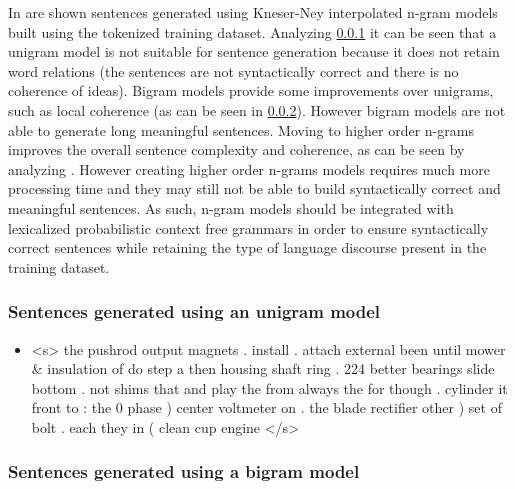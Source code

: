 In  are shown sentences generated using Kneser-Ney interpolated n-gram models built using the tokenized training dataset.
Analyzing \cref{subsec:unigram-sentences} it can be seen that a unigram model is not suitable for sentence generation because it does not retain word relations (the sentences are not syntactically correct and there is no coherence of ideas). Bigram models provide some improvements over unigrams, such as local coherence (as can be seen in \cref{subsec:bigram-sentences}). However bigram models are not able to generate long meaningful sentences. Moving to higher order n-grams improves the overall sentence complexity and coherence, as can be seen by analyzing . However creating higher order n-grams models requires much more processing time and they may still not be able to build syntactically correct and meaningful sentences. As such, n-gram models should be integrated with lexicalized probabilistic context free grammars in order to ensure syntactically correct sentences while retaining the type of language discourse present in the training dataset.



\subsubsection{Sentences generated using an unigram model}\label{subsec:unigram-sentences}

\begin{itemize}
	\item <s> the pushrod output magnets . install . attach external been until mower \& insulation of do step a then housing shaft ring . 224 better bearings slide bottom . not shims that and play the from always the for though . cylinder it front to : the 0 phase ) center voltmeter on . the blade rectifier other ) set of bolt . each they in ( clean cup engine </s>
\end{itemize}


\subsubsection{Sentences generated using a bigram model}\label{subsec:bigram-sentences}

